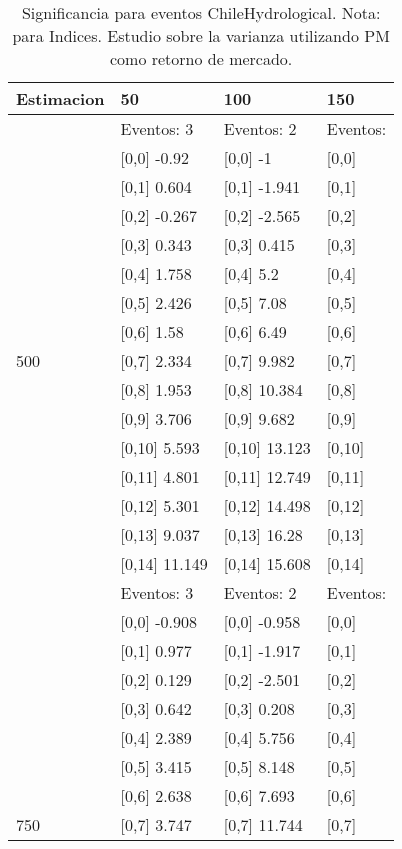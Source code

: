 \begin{table}

\caption{Significancia para eventos ChileHydrological. Nota: para Indices. Estudio sobre la varianza utilizando PM como retorno de mercado.}
\centering
\begin{tabular}[t]{llll}
\toprule
Estimacion & 50 & 100 & 150\\
\midrule
 & Eventos:  3 & Eventos:  2 & Eventos:\\
 & {}[0,0] -0.92 & {}[0,0] -1 & {}[0,0]\\
 & {}[0,1] 0.604 & {}[0,1] -1.941 & {}[0,1]\\
 & {}[0,2] -0.267 & {}[0,2] -2.565 & {}[0,2]\\
 & {}[0,3] 0.343 & {}[0,3] 0.415 & {}[0,3]\\
\addlinespace
 & {}[0,4] 1.758 & {}[0,4] 5.2 & {}[0,4]\\
 & {}[0,5] 2.426 & {}[0,5] 7.08 & {}[0,5]\\
 & {}[0,6] 1.58 & {}[0,6] 6.49 & {}[0,6]\\
500 & {}[0,7] 2.334 & {}[0,7] 9.982 & {}[0,7]\\
 & {}[0,8] 1.953 & {}[0,8] 10.384 & {}[0,8]\\
\addlinespace
 & {}[0,9] 3.706 & {}[0,9] 9.682 & {}[0,9]\\
 & {}[0,10] 5.593 & {}[0,10] 13.123 & {}[0,10]\\
 & {}[0,11] 4.801 & {}[0,11] 12.749 & {}[0,11]\\
 & {}[0,12] 5.301 & {}[0,12] 14.498 & {}[0,12]\\
 & {}[0,13] 9.037 & {}[0,13] 16.28 & {}[0,13]\\
\addlinespace
 & {}[0,14] 11.149 & {}[0,14] 15.608 & {}[0,14]\\
 & Eventos:  3 & Eventos:  2 & Eventos:\\
 & {}[0,0] -0.908 & {}[0,0] -0.958 & {}[0,0]\\
 & {}[0,1] 0.977 & {}[0,1] -1.917 & {}[0,1]\\
 & {}[0,2] 0.129 & {}[0,2] -2.501 & {}[0,2]\\
\addlinespace
 & {}[0,3] 0.642 & {}[0,3] 0.208 & {}[0,3]\\
 & {}[0,4] 2.389 & {}[0,4] 5.756 & {}[0,4]\\
 & {}[0,5] 3.415 & {}[0,5] 8.148 & {}[0,5]\\
 & {}[0,6] 2.638 & {}[0,6] 7.693 & {}[0,6]\\
750 & {}[0,7] 3.747 & {}[0,7] 11.744 & {}[0,7]\\

\end{tabular}
\end{table}
